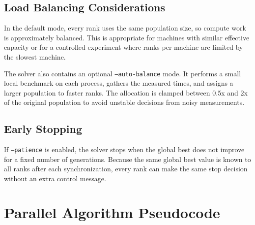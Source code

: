 \documentclass[11pt,a4paper]{article}
\begin{document}
\subsection{Load Balancing Considerations}
In the default mode, every rank uses the same population size, so compute work is
approximately balanced. This is appropriate for machines with similar effective
capacity or for a controlled experiment where ranks per machine are limited by
the slowest machine.

The solver also contains an optional \texttt{--auto-balance} mode. It performs a
small local benchmark on each process, gathers the measured times, and assigns a
larger population to faster ranks. The allocation is clamped between 0.5x and 2x
of the original population to avoid unstable decisions from noisy measurements.

\subsection{Early Stopping}
If \texttt{--patience} is enabled, the solver stops when the global best does not
improve for a fixed number of generations. Because the same global best value is
known to all ranks after each synchronization, every rank can make the same stop
decision without an extra control message.
\newpage

\section{Parallel Algorithm Pseudocode}
\end{document}
